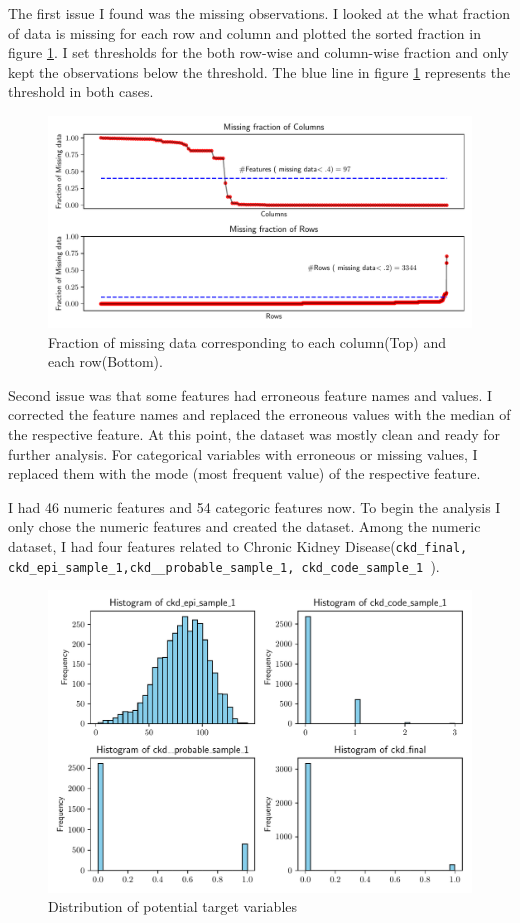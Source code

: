 \documentclass{article}
\begin{document}
The first issue I found was the missing observations. I looked at the what fraction of data is missing for 
each row and column and  plotted the sorted fraction in figure \ref{fig:thresholding}. I set thresholds
for the both row-wise and column-wise fraction and only kept the observations below the threshold. The blue 
line in figure \ref{fig:thresholding} represents the threshold in both cases. 
\begin{figure}
    \centering
    \includegraphics[width=\textwidth]{pp_frac.pdf}
    \caption{Fraction of missing data corresponding to each column(Top) and each row(Bottom).}
    \label{fig:thresholding}
\end{figure}

Second issue was that some features had erroneous feature names and values. I corrected the feature 
names and replaced the erroneous values with the median of the respective feature. At this point, 
the dataset was mostly clean and ready for further analysis. For categorical variables with erroneous
or missing values, I replaced them with the mode (most frequent value) of the respective feature.


I had 46 numeric features and 54 categoric features now. To begin the analysis I only chose the 
numeric features and created the dataset. Among the numeric dataset, I had four features related to Chronic
Kidney Disease(\texttt{ckd\_final, ckd\_epi\_sample\_1,ckd\_\_probable\_sample\_1, ckd\_code\_sample\_1 }). 
\begin{figure}
    \centering
    \includegraphics[scale=.7]{4var_hist.pdf}
    \caption{Distribution of potential target variables}
    \label{fig:4varhist}
\end{figure}
\end{document}
